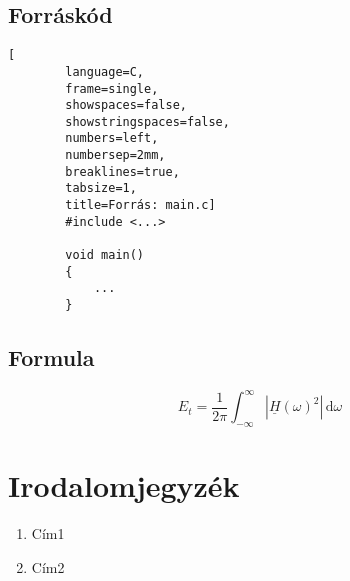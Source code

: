 \documentclass[oneside,a4paper,9pt]{article}
\begin{document}
	\subsection{Forráskód}
	
	\begin{lstlisting}[
		language=C,
		frame=single,
		showspaces=false,
		showstringspaces=false,
		numbers=left,
		numbersep=2mm,
		breaklines=true,
		tabsize=1,
		title=Forrás: main.c]
		#include <...>
		
		void main()
		{
			...
		}
	\end{lstlisting}
	
	\subsection{Formula}
	
	$$ E_t = \dfrac{1}{2\pi} \int_{-\infty}^{\infty} |\underline{H}(\omega)^2|\, \mathrm{d}\omega $$
	
	\bigskip
	
	\pagebreak
	\section{Irodalomjegyzék}
	
	\begin{enumerate}
		\item Cím1
		\item Cím2
	\end{enumerate}
	
\end{document}
